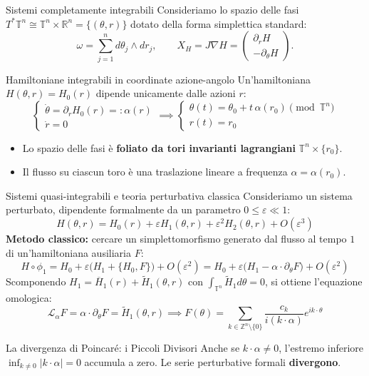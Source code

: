 \documentclass[10pt,aspectratio=169]{beamer}
\newcommand{\T}{\mathbb{T}}
\newcommand{\R}{\mathbb{R}}
\newcommand{\Z}{\mathbb{Z}}
\newcommand{\eps}{\varepsilon}
\newcommand{\blu}[1]{\textcolor{UniBlue}{\textbf{#1}}}
\begin{document}
\begin{frame}{Sistemi completamente integrabili}
  Consideriamo lo spazio delle fasi $T^*\T^n \cong \T^n \times \R^n = \{(\theta, r)\}$ dotato della forma simplettica standard:
  \[
    \omega = \sum_{j=1}^n d\theta_j \wedge dr_j, \qquad X_H = J\nabla H = \begin{pmatrix} \partial_r H \\ -\partial_\theta H \end{pmatrix}.
  \]
  \pause
  \begin{block}{Hamiltoniane integrabili in coordinate azione-angolo}
    Un'hamiltoniana $H(\theta, r) = H_0(r)$ dipende unicamente dalle azioni $r$:
    \[
      \begin{cases}
        \dot{\theta} = \partial_r H_0(r) =: \alpha(r) \\
        \dot{r} = 0
      \end{cases}
      \implies 
      \begin{cases}
        \theta(t) = \theta_0 + t\,\alpha(r_0) \pmod{\T^n} \\
        r(t) = r_0
      \end{cases}
    \]
  \end{block}
  \begin{itemize}
    \item Lo spazio delle fasi è \textbf{foliato da tori invarianti lagrangiani} $\T^n \times \{r_0\}$.
    \item Il flusso su ciascun toro è una traslazione lineare a frequenza $\alpha = \alpha(r_0)$.
  \end{itemize}
\end{frame}

\begin{frame}{Sistemi quasi-integrabili e teoria perturbativa classica}
  Consideriamo un sistema perturbato, dipendente formalmente da un parametro $0 \le \eps \ll 1$:
  \[
    H(\theta, r) = H_0(r) + \eps H_1(\theta, r) + \eps^2 H_2(\theta, r) + O(\varepsilon^3)
  \]
  \pause
  \blu{Metodo classico:} cercare un simplettomorfismo generato dal flusso al tempo $1$ di un'hamiltoniana ausiliaria $F$:
  \[
    H \circ \phi_1 = H_0 + \eps \big(H_1 + \{H_0, F\}\big) + O(\eps^2) = H_0 + \eps \big(H_1 - \alpha \cdot \partial_\theta F\big) + O(\eps^2)
  \]
  \pause
  Scomponendo $H_1 = \overline{H}_1(r) + \widetilde{H}_1(\theta, r)$ con $\int_{\T^n} \widetilde{H}_1 d\theta = 0$, si ottiene l'\alert{equazione omologica}:
  \[
    \mathcal{L}_\alpha F = \alpha \cdot \partial_\theta F = \widetilde{H}_1(\theta, r) \implies F(\theta) = \sum_{k \in \Z^n \setminus \{0\}} \frac{c_k}{i(k \cdot \alpha)} e^{i k \cdot \theta}
  \]
  \begin{alertblock}{La divergenza di Poincaré: i Piccoli Divisori}
    Anche se $k \cdot \alpha \neq 0$, l'estremo inferiore $\inf_{k \neq 0} |k \cdot \alpha| = 0$ accumula a zero. Le serie perturbative formali \textbf{divergono}.
  \end{alertblock}
\end{frame}
\end{document}
